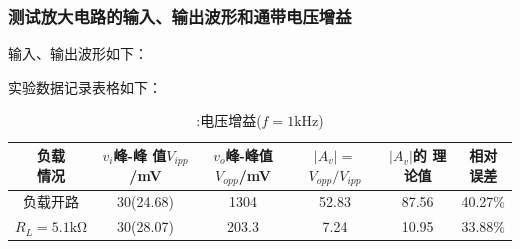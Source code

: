 \documentclass[a4paper,11pt,UTF8]{article}
\numberwithin{equation}{subsection}
\begin{document}
\subsubsection{测试放大电路的输入、输出波形和通带电压增益}
输入、输出波形如下：
\begin{figure}[H]
\end{figure}
实验数据记录表格如下：
\begin{table}[H]
	\centering
	\begin{tabular}{|c|c|c|c|c|c|}
			\hline
			\shortstack{负载\\情况} & \shortstack{$v_i$峰-峰\\值$V_{ipp}$/mV} & \shortstack{$v_o$峰-峰值\\$V_{opp}$/mV} & \shortstack{$|A_v|=$\\$V_{opp}/V_{ipp}$}	& \shortstack{$|A_v|$的\\理论值} & \shortstack{相对\\误差}\\
			\hline
			负载开路 & 30(24.68) & 1304& 52.83& 87.56 & 40.27\%\\
			\hline
			$R_L=5.1\mathrm{k\Omega}$ & 30(28.07) & 203.3 & 7.24 & 10.95 &33.88\%\\
			\hline		
		\end{tabular}
	\caption{:电压增益($f\mathrm{=}\mathrm{1kHz}$)}
\end{table}
\end{document}
